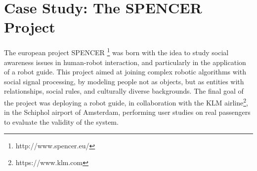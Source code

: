 \part{Case Study: The SPENCER Project} %

\label{part:case_study} %


The european project SPENCER \footnote{http://www.spencer.eu/} was born with the idea to study social awareness issues in human-robot interaction, and particularly in the application of a robot guide. This project aimed at joining complex robotic algorithms  with social signal processing, by modeling people not as objects, but as entities with relationships, social rules, and culturally diverse backgrounds. The final goal of the project was deploying a robot guide, in collaboration with the KLM airline\footnote{https://www.klm.com}, in the Schiphol airport of Amsterdam, performing user studies on real passengers to evaluate the validity of the system.


 
 

